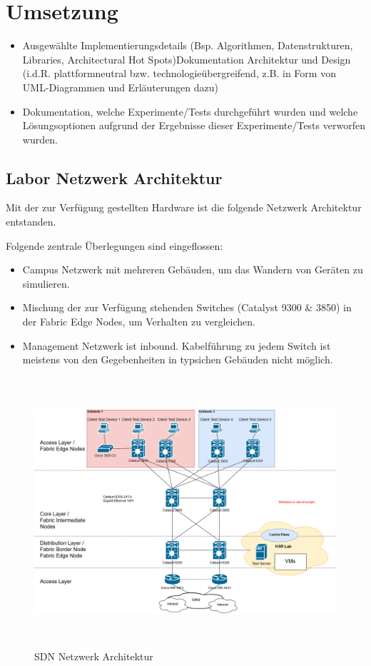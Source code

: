 \section{Umsetzung}

\begin{itemize}
	\item Ausgewählte Implementierungsdetails (Bsp. Algorithmen, Datenstrukturen, Libraries, Architectural Hot Spots)Dokumentation Architektur und Design (i.d.R. plattformneutral bzw. technologieübergreifend, z.B. in Form von UML-Diagrammen und Erläuterungen dazu)
	\item Dokumentation, welche Experimente/Tests durchgeführt wurden und welche Lösungsoptionen aufgrund der Ergebnisse dieser Experimente/Tests verworfen wurden.
\end{itemize}

\subsection{Labor Netzwerk Architektur}
Mit der zur Verfügung gestellten Hardware ist die folgende Netzwerk Architektur entstanden.

Folgende zentrale Überlegungen sind eingeflossen:

\begin{itemize}
	\item Campus Netzwerk mit mehreren Gebäuden, um das Wandern von Geräten zu simulieren.
	\item Mischung der zur Verfügung stehenden Switches (Catalyst 9300 \& 3850) in der Fabric Edge Nodes, um Verhalten zu vergleichen.
	\item Management Netzwerk ist inbound. Kabelführung zu jedem Switch ist meistens von den Gegebenheiten in typsichen Gebäuden nicht möglich.
\end{itemize}


\begin{figure}[H]
	\centering
	\includegraphics[height=10cm]{img/LabNetworkArchitecture.png}
	\caption{SDN Netzwerk Architektur}
	\label{fig:LabNetworkArchitecture}
\end{figure}

